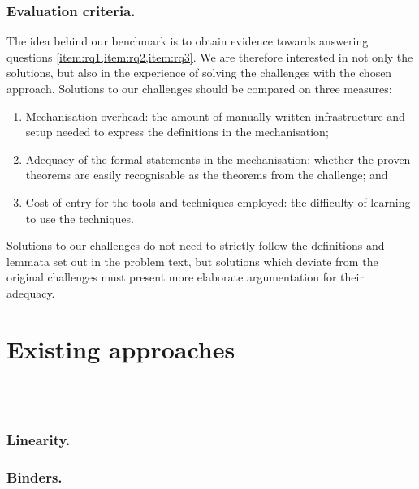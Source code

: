 \documentclass[runningheads]{llncs}
\begin{document}
\subsubsection{Evaluation criteria.}
The idea behind our benchmark is to obtain evidence towards answering questions \cref{item:rq1,item:rq2,item:rq3}. We are therefore interested in not only the solutions, but also in the experience of solving the challenges with the chosen approach.
Solutions to our challenges should be compared on three measures:
\begin{enumerate}
\item Mechanisation overhead: the amount of manually written infrastructure and setup needed to express the definitions in the mechanisation;
\item Adequacy of the formal statements in the mechanisation: whether the proven theorems are easily recognisable as the theorems from the challenge; and
\item Cost of entry for the tools and techniques employed: the difficulty of learning to use the techniques.
\end{enumerate}
Solutions to our challenges do not need to strictly follow the definitions and lemmata set out in the problem text, but solutions which deviate from the original challenges must present more elaborate argumentation for their adequacy.


\section{Existing approaches}\label{sec:approaches}

 \\
 \\

\subsubsection{Linearity.}


\subsubsection{Binders.}

\end{document}
